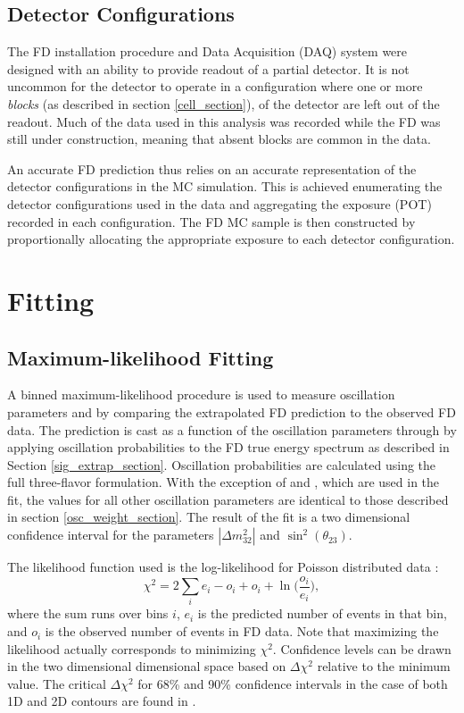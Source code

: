 \subsection{Detector Configurations}

The \nova FD installation procedure and Data Acquisition (DAQ) system were
designed with an ability to provide readout of a partial detector.
It is not uncommon for the detector to operate in a configuration where
one or more \textit{blocks} (as described in section \ref{cell_section}),
of the detector are left out of the readout.
Much of the data used in this analysis was recorded while the \nova FD
was still under construction, meaning that absent blocks are common
in the data.

An accurate FD prediction thus relies on an accurate representation
of the detector configurations in the MC simulation.
This is achieved enumerating the detector configurations
used in the data and aggregating the exposure (POT) recorded
in each configuration.
The FD MC sample is then constructed by proportionally allocating
the appropriate exposure to each detector configuration.

\section{Fitting}

\label{fitting_section}

\subsection{Maximum-likelihood Fitting}
\label{bayesian_fitting_section}

A binned maximum-likelihood procedure is used to measure oscillation parameters
\deltamtht and \thetatth by comparing the extrapolated FD prediction to the
observed FD data.
The prediction is cast as a function of the oscillation parameters
through by applying oscillation probabilities to the FD true energy spectrum
as described in Section \ref{sig_extrap_section}.
Oscillation probabilities are calculated using the full three-flavor
formulation.
With the exception of \deltamtht and \thetatth, which are used in the fit,
the values for all other oscillation parameters are identical to those
described in section \ref{osc_weight_section}.
The result of the fit is a two dimensional confidence interval
for the parameters $|\Delta m^2_{32}|$ and $\sin^2(\theta_{23})$.

The likelihood function used is the log-likelihood for Poisson distributed
data \cite{pdg}:
\begin{equation}
\chi^2 = 2 \sum_i e_i - o_i + o_i + \ln \bigg (\frac{o_i}{e_i} \bigg),
\end{equation}
where the sum runs over bins $i$, $e_i$ is the predicted number of events
in that bin, and $o_i$ is the observed number of events in FD data.
Note that maximizing the likelihood actually corresponds to minimizing
$\chi^2$.
Confidence levels can be drawn in the two dimensional dimensional space
based on $\Delta \chi^2$ relative to the minimum value.
The critical $\Delta \chi^2$ for 68\% and 90\% confidence intervals
in the case of both 1D and 2D contours are found in \cite{pdg}.

